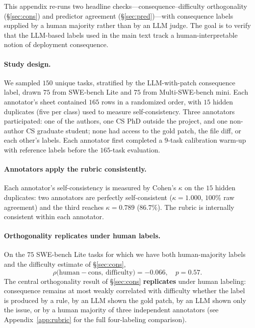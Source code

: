 \documentclass{article}
\begin{document}
This appendix re-runs two headline checks---consequence--difficulty
orthogonality (\S\ref{sec:cons}) and predictor agreement
(\S\ref{sec:pred})---with consequence labels supplied by a human
majority rather than by an LLM judge. The goal is to verify that the
LLM-based labels used in the main text track a human-interpretable
notion of deployment consequence.

\paragraph{Study design.} We sampled $150$ unique tasks, stratified by
the LLM-with-patch consequence label, drawn $75$ from SWE-bench Lite
and $75$ from Multi-SWE-bench mini. Each annotator's sheet contained
$165$ rows in a randomized order, with $15$ hidden duplicates (five
per class) used to measure self-consistency. Three annotators
participated: one of the authors, one CS PhD outside the project, and
one non-author CS graduate student; none had access to the gold patch,
the file diff, or each other's labels. Each annotator first completed
a $9$-task calibration warm-up with reference labels before the
$165$-task evaluation.

\paragraph{Annotators apply the rubric consistently.} Each annotator's
self-consistency is measured by Cohen's $\kappa$ on the $15$ hidden
duplicates: two annotators are perfectly self-consistent
($\kappa = 1.000$, $100\%$ raw agreement) and the third reaches
$\kappa = 0.789$ ($86.7\%$). The rubric is internally consistent
within each annotator.

\paragraph{Orthogonality replicates under human labels.} On the $75$
SWE-bench Lite tasks for which we have both human-majority labels and
the difficulty estimate of \S\ref{sec:cons},
\[
\rho\bigl(\mathrm{human}\!-\!\mathrm{cons},\ \mathrm{difficulty}\bigr) = -0.066,\quad p = 0.57.
\]
The central orthogonality result of \S\ref{sec:cons} \textbf{replicates}
under human labeling: consequence remains at most weakly correlated with
difficulty whether the label is produced by a rule, by an LLM shown
the gold patch, by an LLM shown only the issue, or by a human
majority of three independent annotators
(see Appendix~\ref{app:rubric} for the full four-labeling comparison).
\end{document}
